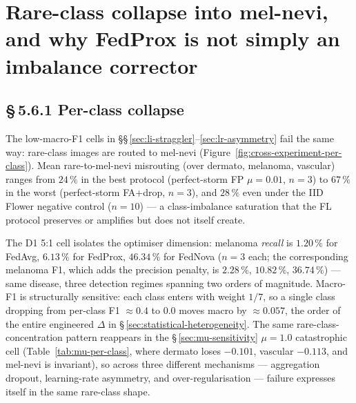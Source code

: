 
\section{Rare-class collapse into mel-nevi, and why FedProx is not simply
an imbalance corrector}
\label{sec:rare-class-collapse}


\subsection*{\S\,5.6.1 Per-class collapse}

The low-macro-F1 cells in \S\S\,\ref{sec:li-straggler}--\ref{sec:lr-asymmetry}
fail the same way: rare-class images are routed to mel-nevi
(Figure~\ref{fig:cross-experiment-per-class}). Mean rare-to-mel-nevi
misrouting (over dermato, melanoma, vascular) ranges from $24\,\%$ in the
best protocol (perfect-storm FP $\mu = 0.01$, $n=3$) to $67\,\%$ in the
worst (perfect-storm FA+drop, $n=3$), and $28\,\%$ even under the IID
Flower negative control ($n=10$) --- a class-imbalance saturation that the
FL protocol preserves or amplifies but does not itself create.

The D1 5:1 cell isolates the optimiser dimension: melanoma \emph{recall} is
$1.20\,\%$ for FedAvg, $6.13\,\%$ for FedProx, $46.34\,\%$ for FedNova
($n=3$ each; the corresponding melanoma F1, which adds the precision penalty,
is $2.28\,\%$, $10.82\,\%$, $36.74\,\%$) --- same disease, three detection
regimes spanning two orders of magnitude. Macro-F1 is structurally sensitive: each class enters with
weight $1/7$, so a single class dropping from per-class F1 $\approx 0.4$ to
$0.0$ moves macro by $\approx 0.057$, the order of the entire engineered
$\Delta$ in \S\,\ref{sec:statistical-heterogeneity}. The same
rare-class-concentration pattern reappears in the
\S\,\ref{sec:mu-sensitivity} $\mu = 1.0$ catastrophic cell
(Table~\ref{tab:mu-per-class}, where dermato loses $-0.101$, vascular
$-0.113$, and mel-nevi is invariant), so across three different mechanisms
--- aggregation dropout, learning-rate asymmetry, and over-regularisation
--- failure expresses itself in the same rare-class shape.

